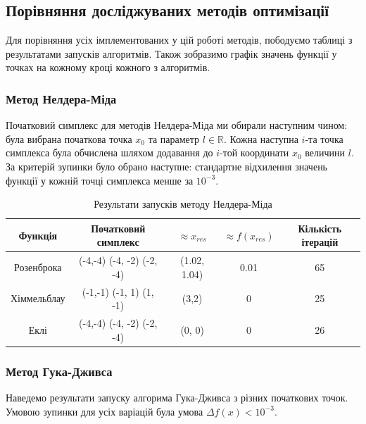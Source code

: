\pagebreak
\subsection*{Порівняння досліджуваних методів оптимізації}
Для порівняння усіх імплементованих у цій роботі методів,
пободуємо таблиці з результатами запусків алгоритмів.
Також зобразимо графік значень функції у точках на кожному кроці кожного
з алгоритмів.

\subsubsection*{Метод Нелдера-Міда}
Початковий симплекс для методів Нелдера-Міда ми обирали наступним чином:
була вибрана початкова точка $x_0$ та параметр $l \in \mathbb{R}$.
Кожна наступна $i$-та точка симплекса була обчислена шляхом додавання
до $i$-той координати $x_0$ величини $l$. За критерій зупинки
було обрано наступне: стандартне відхилення значень функції
у кожній точці симплекса менше за $10^{-3}$.

\begin{table}[h!]
    \centering
    \begin{tabular}{|c|c|c|c|c|}
        \hline
        \textbf{Функція} & \textbf{Початковий симплекс} & $\approx x_{res}$ & $\approx f(x_{res})$ & \textbf{Кількість ітерацій}  \\
        \hline
        Розенброка & (-4,-4) (-4, -2) (-2, -4) & (1.02, 1.04) & 0.01 & 65
        \\ \hline
        Хіммельблау & (-1,-1) (-1, 1) (1, -1) & (3,2) & 0 & 25
        \\ \hline
        Еклі & (-4,-4) (-4, -2) (-2, -4) & (0, 0) & 0 & 26
        \\ \hline
    \end{tabular}
    \caption{Результати запусків методу Нелдера-Міда}
\end{table}

\subsubsection*{Метод Гука-Дживса}

Наведемо результати запуску алгорима Гука-Дживса
з різних початкових точок.
Умовою зупинки для усіх варіацій була
умова $\Delta f(x) < 10^{-3}$.

